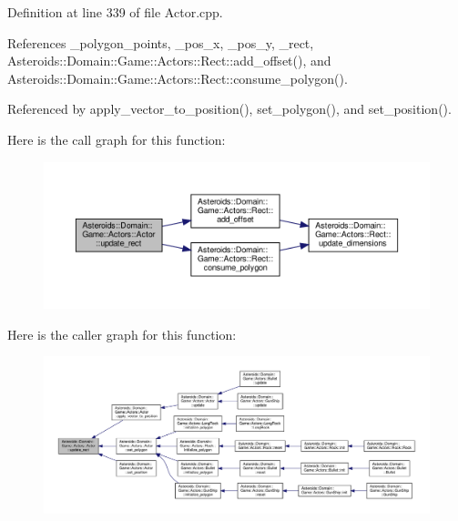Definition at line 339 of file Actor.\+cpp.



References \+\_\+polygon\+\_\+points, \+\_\+pos\+\_\+x, \+\_\+pos\+\_\+y, \+\_\+rect, Asteroids\+::\+Domain\+::\+Game\+::\+Actors\+::\+Rect\+::add\+\_\+offset(), and Asteroids\+::\+Domain\+::\+Game\+::\+Actors\+::\+Rect\+::consume\+\_\+polygon().



Referenced by apply\+\_\+vector\+\_\+to\+\_\+position(), set\+\_\+polygon(), and set\+\_\+position().

Here is the call graph for this function\+:\nopagebreak
\begin{figure}[H]
\begin{center}
\leavevmode
\includegraphics[width=350pt]{classAsteroids_1_1Domain_1_1Game_1_1Actors_1_1Actor_a4bb89af7457ff402fa5a4a11d62ab4ca_cgraph}
\end{center}
\end{figure}
Here is the caller graph for this function\+:\nopagebreak
\begin{figure}[H]
\begin{center}
\leavevmode
\includegraphics[width=350pt]{classAsteroids_1_1Domain_1_1Game_1_1Actors_1_1Actor_a4bb89af7457ff402fa5a4a11d62ab4ca_icgraph}
\end{center}
\end{figure}
\mbox{\label{classAsteroids_1_1Domain_1_1Game_1_1Actors_1_1Actor_a3a07885ee6c81cea6b94b691d7d538c9}} 
